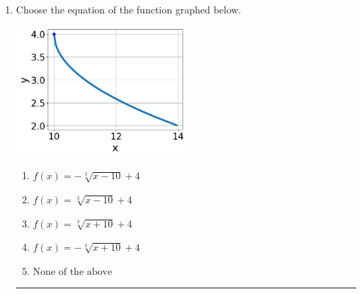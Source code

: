 \documentclass[14pt]{extbook}
\newcommand{\litem}[1]{\item#1\hspace*{-1cm}\rule{\textwidth}{0.4pt}}
\begin{document}
\begin{enumerate}
\litem{
Choose the equation of the function graphed below.
\begin{center}
    \includegraphics[width=0.5\textwidth]{../Figures/radicalGraphToEquationB.png}
\end{center}
\begin{enumerate}[label=\Alph*.]
\item \( f(x) = - \sqrt[3]{x - 10} + 4 \)
\item \( f(x) = \sqrt[3]{x - 10} + 4 \)
\item \( f(x) = \sqrt[3]{x + 10} + 4 \)
\item \( f(x) = - \sqrt[3]{x + 10} + 4 \)
\item \( \text{None of the above} \)


\end{enumerate}}
\end{enumerate}
\end{document}
